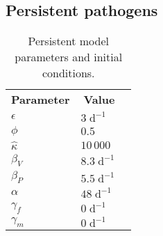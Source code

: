 \documentclass{article}
\begin{document}
\subsection{Persistent pathogens}

\begin{table}
  \centering
  \begin{tabular}{llr}
    \textbf{Parameter}
    & \multicolumn{1}{r}{\textbf{Value}}
    \\
    $\epsilon$ & $3\;\text{d}^{-1}$
    \\
    $\phi$ & $0.5$
    \\
    $\hat{\kappa}$ & $10\,000$
    \\
    $\beta_V$ & $8.3\;\text{d}^{-1}$
    \\
    $\beta_P$ & $5.5\;\text{d}^{-1}$
    \\
    $\alpha$ & $48\;\text{d}^{-1}$
    \\
    $\gamma_f$ & $0\;\text{d}^{-1}$
    \\
    $\gamma_m$ & $0\;\text{d}^{-1}$
    \\
  \end{tabular}
  \caption{Persistent model parameters and initial conditions.}
\end{table}
\end{document}
